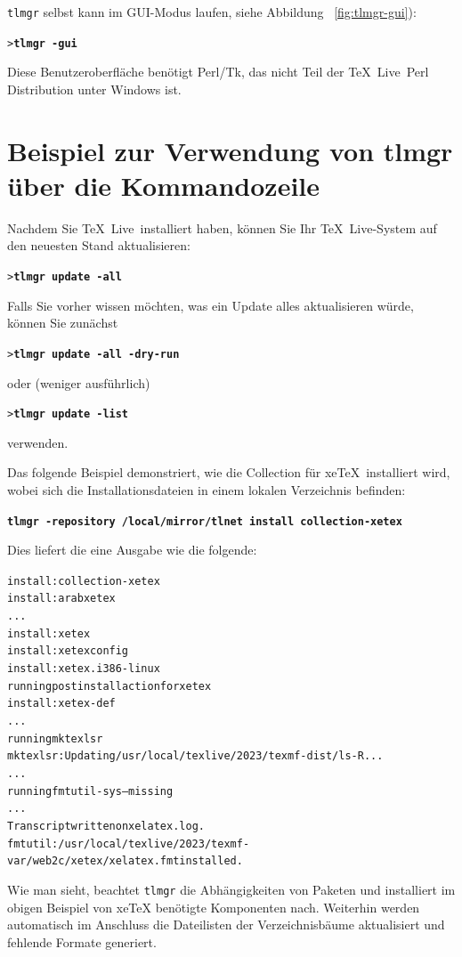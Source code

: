 \documentclass[12pt,ngerman,a4paper,fullparskip]{report}
\newcommand{\TL}{\TeX\ Live\xspace}
\newcommand{\prog}[1]{\texttt{#1}}
\newcommand{\Ucom}[1]{\textbf{\texttt{#1}}}
\providecommand*{\XeTeX}{xe\TeX\xspace}
\begin{document}
\prog{tlmgr} selbst kann im GUI-Modus laufen, siehe Abbildung
~\ref{fig:tlmgr-gui}):

\begin{alltt}
> \Ucom{tlmgr -gui}
\end{alltt}

Diese Benutzeroberfläche benötigt Perl/Tk, das nicht Teil der \TL\ Perl Distribution unter Windows ist.

\section{Beispiel zur Verwendung von tlmgr über die Kommandozeile}


Nachdem Sie \TL\ installiert haben, können Sie Ihr \TL-System auf den
neuesten Stand aktualisieren:
\begin{alltt}
> \Ucom{tlmgr update -all}
\end{alltt}
Falls Sie vorher wissen möchten, was ein Update alles aktualisieren würde, können Sie zunächst
\begin{alltt}
> \Ucom{tlmgr update -all -dry-run}
\end{alltt}
oder (weniger ausführlich)
\begin{alltt}
> \Ucom{tlmgr update -list}
\end{alltt}
verwenden.

Das folgende Beispiel demonstriert, wie die Collection für \XeTeX\ installiert
wird, wobei sich die Installationsdateien in einem lokalen Verzeichnis
befinden:
 
\begin{alltt}
\Ucom{tlmgr -repository /local/mirror/tlnet install collection-xetex}
\end{alltt}
Dies liefert die eine  Ausgabe wie die folgende:

\begin{alltt}\small
install: collection-xetex
install: arabxetex
...
install: xetex
install: xetexconfig
install: xetex.i386-linux
running post install action for xetex
install: xetex-def
...
running mktexlsr
mktexlsr: Updating /usr/local/texlive/2023/texmf-dist/ls-R...
...
running fmtutil-sys --missing
...
Transcript written on xelatex.log.
fmtutil: /usr/local/texlive/2023/texmf-var/web2c/xetex/xelatex.fmt installed.
\end{alltt}

Wie man sieht, beachtet \prog{tlmgr} die Abhängigkeiten von Paketen und installiert im obigen Beispiel von \XeTeX{} benötigte Komponenten nach. Weiterhin werden automatisch im Anschluss die Dateilisten der Verzeichnisbäume aktualisiert und fehlende Formate generiert.
\end{document}
